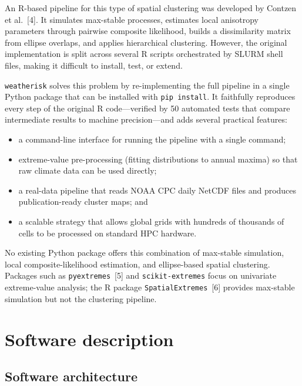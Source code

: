 \documentclass[preprint,12pt,a4paper]{elsarticle}
\begin{document}
An R-based pipeline for this type of spatial clustering was developed
by Contzen et al.~[4].  It simulates max-stable processes,
estimates local anisotropy parameters through pairwise composite
likelihood, builds a dissimilarity matrix from ellipse overlaps, and
applies hierarchical clustering.  However, the original
implementation is split across several R scripts orchestrated by
SLURM shell files, making it difficult to install, test, or extend.

\texttt{weatherisk} solves this problem by re-implementing the full
pipeline in a single Python package that can be installed with
\texttt{pip install}.  It faithfully reproduces every step of the
original R code---verified by 50 automated tests that compare
intermediate results to machine precision---and adds several
practical features:
\begin{itemize}
\item a command-line interface for running the pipeline with a single
  command;
\item extreme-value pre-processing (fitting distributions to annual
  maxima) so that raw climate data can be used directly;
\item a real-data pipeline that reads NOAA CPC daily NetCDF files and
  produces publication-ready cluster maps; and
\item a scalable strategy that allows global grids with hundreds of
  thousands of cells to be processed on standard HPC hardware.
\end{itemize}

No existing Python package offers this combination of max-stable
simulation, local composite-likelihood estimation, and
ellipse-based spatial clustering.  Packages such as
\texttt{pyextremes}~[5] and \texttt{scikit-extremes} focus on
univariate extreme-value analysis; the R package
\texttt{SpatialExtremes}~[6] provides max-stable simulation but
not the clustering pipeline.

\section{Software description}
\label{sec:description}

\subsection{Software architecture}
\label{sec:architecture}
\end{document}

